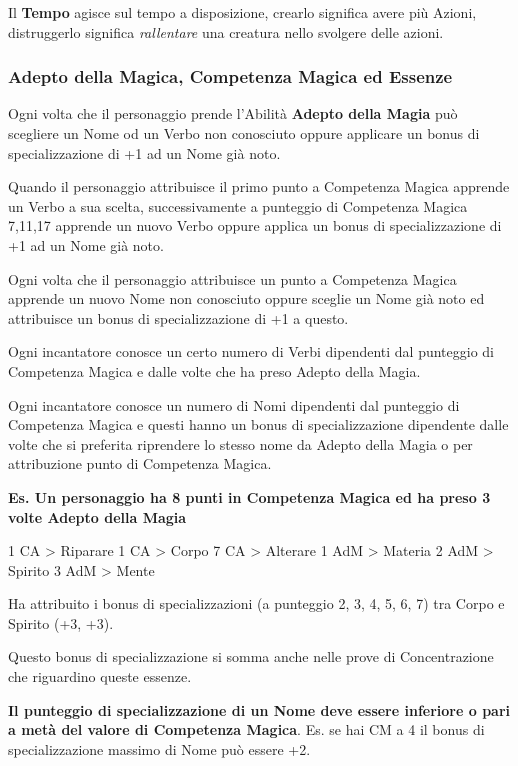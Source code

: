 \documentclass[a4paper,twoside,openany]{book}
\begin{document}
\begin{multicols}{2}
Il \textbf{Tempo} agisce sul tempo a disposizione, crearlo significa avere più Azioni, distruggerlo significa \emph{rallentare} una creatura nello svolgere delle azioni.


\subsubsection{Adepto della Magica, Competenza Magica ed Essenze}

\label{competenza-magica-ed-essenza}

Ogni volta che il personaggio prende l'Abilità \textbf{Adepto della Magia} può scegliere un Nome od un Verbo non conosciuto oppure applicare un bonus di specializzazione di +1 ad un Nome già noto.

Quando il personaggio attribuisce il primo punto a Competenza Magica apprende un Verbo a sua scelta, successivamente a punteggio di Competenza Magica 7,11,17 apprende un nuovo Verbo oppure applica un bonus di specializzazione di +1 ad un Nome già noto.

Ogni volta che il personaggio attribuisce un punto a Competenza Magica apprende un nuovo Nome non conosciuto oppure sceglie un Nome già noto ed attribuisce un bonus di specializzazione di +1 a questo.

Ogni incantatore conosce un certo numero di Verbi dipendenti dal punteggio di Competenza Magica e dalle volte che ha preso Adepto della Magia.

Ogni incantatore conosce un numero di Nomi dipendenti dal punteggio di Competenza Magica e questi hanno un bonus di specializzazione dipendente dalle volte che si preferita riprendere lo stesso nome da Adepto della Magia o per attribuzione punto di Competenza Magica.


\bigskip

\textbf{Es. Un personaggio ha 8 punti in Competenza Magica ed ha preso 3 volte Adepto della Magia}

1 CA > Riparare
1 CA > Corpo
7 CA > Alterare
1 AdM > Materia
2 AdM > Spirito
3 AdM > Mente

Ha attribuito i bonus di specializzazioni (a punteggio 2, 3, 4, 5, 6, 7) tra Corpo e Spirito (+3, +3).

Questo bonus di specializzazione si somma anche nelle prove di Concentrazione che riguardino queste essenze.

\textbf{Il punteggio di specializzazione di un Nome deve essere inferiore o pari a metà del valore di Competenza Magica}. Es. se hai CM a 4 il bonus di specializzazione massimo di Nome può essere +2.


\end{multicols}
\end{document}
